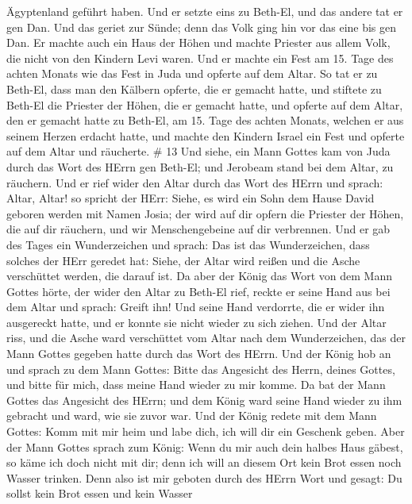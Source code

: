 Ägyptenland geführt haben.  Und er setzte eins zu Beth-El,
und das andere tat er gen Dan.  Und das geriet zur Sünde;
denn das Volk ging hin vor das eine bis gen Dan.  Er machte
auch ein Haus der Höhen und machte Priester aus allem Volk, die nicht
von den Kindern Levi waren.  Und er machte ein Fest am 15.
Tage des achten Monats wie das Fest in Juda und opferte auf dem Altar.
So tat er zu Beth-El, dass man den Kälbern opferte, die er gemacht
hatte, und stiftete zu Beth-El die Priester der Höhen, die er gemacht
hatte,  und opferte auf dem Altar, den er gemacht hatte zu
Beth-El, am 15. Tage des achten Monats, welchen er aus seinem Herzen
erdacht hatte, und machte den Kindern Israel ein Fest und opferte auf
dem Altar und räucherte. \# 13  Und siehe, ein Mann Gottes
kam von Juda durch das Wort des HErrn gen Beth-El; und Jerobeam stand
bei dem Altar, zu räuchern.  Und er rief wider den Altar
durch das Wort des HErrn und sprach: Altar, Altar! so spricht der HErr:
Siehe, es wird ein Sohn dem Hause David geboren werden mit Namen Josia;
der wird auf dir opfern die Priester der Höhen, die auf dir räuchern,
und wir Menschengebeine auf dir verbrennen.  Und er gab des
Tages ein Wunderzeichen und sprach: Das ist das Wunderzeichen, dass
solches der HErr geredet hat: Siehe, der Altar wird reißen und die Asche
verschüttet werden, die darauf ist.  Da aber der König das
Wort von dem Mann Gottes hörte, der wider den Altar zu Beth-El rief,
reckte er seine Hand aus bei dem Altar und sprach: Greift ihn! Und seine
Hand verdorrte, die er wider ihn ausgereckt hatte, und er konnte sie
nicht wieder zu sich ziehen.  Und der Altar riss, und die
Asche ward verschüttet vom Altar nach dem Wunderzeichen, das der Mann
Gottes gegeben hatte durch das Wort des HErrn.  Und der
König hob an und sprach zu dem Mann Gottes: Bitte das Angesicht des
Herrn, deines Gottes, und bitte für mich, dass meine Hand wieder zu mir
komme. Da bat der Mann Gottes das Angesicht des HErrn; und dem König
ward seine Hand wieder zu ihm gebracht und ward, wie sie zuvor war.
 Und der König redete mit dem Mann Gottes: Komm mit mir heim
und labe dich, ich will dir ein Geschenk geben.  Aber der
Mann Gottes sprach zum König: Wenn du mir auch dein halbes Haus gäbest,
so käme ich doch nicht mit dir; denn ich will an diesem Ort kein Brot
essen noch Wasser trinken.  Denn also ist mir geboten durch
des HErrn Wort und gesagt: Du sollst kein Brot essen und kein Wasser

